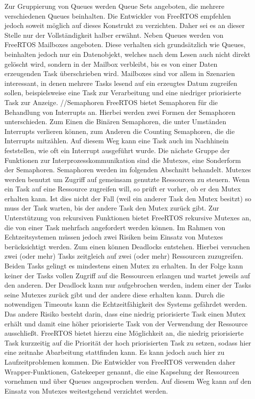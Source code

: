 Zur Gruppierung von Queues werden Queue Sets angeboten, die mehrere verschiedenen Queues beinhalten. Die Entwickler von FreeRTOS empfehlen jedoch soweit möglich auf dieses Konstrukt zu verzichten. Daher sei es an dieser Stelle nur der Vollständigkeit halber erwähnt.
Neben Queues werden von FreeRTOS Mailboxes angeboten. Diese verhalten sich grundsätzlich wie Queues, beinhalten jedoch nur ein Datenobjekt, welches nach dem Lesen auch nicht direkt gelöscht wird, sondern in der Mailbox verbleibt, bis es von einer Daten erzeugenden Task überschrieben wird. Mailboxes sind vor allem in Szenarien interessant, in denen mehrere Tasks lesend auf ein erzeugtes Datum zugreifen sollen, beispielsweise eine Task zur Verarbeitung und eine niedriger priorisierte Task zur Anzeige.
//Semaphoren
FreeRTOS bietet Semaphoren für die Behandlung von Interrupts an. Hierbei werden zwei Formen der Semaphoren unterschieden. Zum Einen die Binären Semaphoren, die unter Umständen Interrupts verlieren können, zum Anderen die Counting Semaphoren, die die Interrupts mitzählen. Auf diesem Weg kann eine Task auch im Nachhinein feststellen, wie oft ein Interrupt ausgeführt wurde.
Die nächste Gruppe der Funktionen zur Interprozesskommunikation sind die Mutexes, eine Sonderform der Semaphoren. Semaphoren werden im folgenden Abschnitt behandelt. Mutexes werden benutzt um Zugriff auf gemeinsam genutzte Ressourcen zu steuern. Wenn ein Task auf eine Ressource zugreifen will, so prüft er vorher, ob er den Mutex erhalten kann. Ist dies nicht der Fall (weil ein anderer Task den Mutex besitzt) so muss der Task warten, bis der andere Task den Mutex zurück gibt. Zur Unterstützung von rekursiven Funktionen bietet FreeRTOS rekursive Mutexes an, die von einer Task mehrfach angefordert werden können.
Im Rahmen von Echtzeitsystemen müssen jedoch zwei Risiken beim Einsatz von Mutexes berücksichtigt werden. Zum einen können Deadlocks entstehen. Hierbei versuchen zwei (oder mehr) Tasks zeitgleich auf zwei (oder mehr) Ressourcen zuzugreifen. Beiden Tasks gelingt es mindestens einen Mutex zu erhalten. In der Folge kann keiner der Tasks vollen Zugriff auf die Ressourcen erlangen und wartet jeweils auf den anderen. Der Deadlock kann nur aufgebrochen werden, indem einer der Tasks seine Mutexes zurück gibt und der andere diese erhalten kann. Durch die notwendigen Timeouts kann die Echtzeitfähigkeit des Systems gefährdet werden.
Das andere Risiko besteht darin, dass eine niedrig priorisierte Task einen Mutex erhält und damit eine höher priorisierte Task von der Verwendung der Ressource ausschließt. FreeRTOS bietet hierzu eine Möglichkeit an, die niedrig priorisierte Task kurzzeitig auf die Priorität der hoch priorisierten Task zu setzen, sodass hier eine zeitnahe Abarbeitung stattfinden kann. Es kann jedoch auch hier zu Laufzeitproblemen kommen. Die Entwickler von FreeRTOS verwenden daher Wrapper-Funktionen, Gatekeeper genannt, die eine Kapselung der Ressourcen vornehmen und über Queues angesprochen werden. Auf diesem Weg kann auf den Einsatz von Mutexes weitestgehend verzichtet werden.
